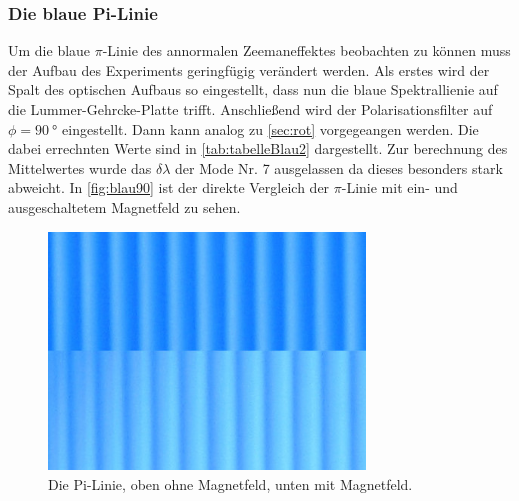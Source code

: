\subsubsection{Die blaue Pi-Linie}
Um die blaue $\pi$-Linie des annormalen Zeemaneffektes beobachten zu können muss der 
Aufbau des Experiments geringfügig verändert werden. Als erstes wird der Spalt des optischen 
Aufbaus so eingestellt, dass nun die blaue Spektrallienie auf die Lummer-Gehrcke-Platte trifft.
Anschließend wird der Polarisationsfilter auf $\phi=\SI[]{90}[]{\degree}$ eingestellt.
Dann kann analog zu \autoref{sec:rot} vorgegeangen werden. Die dabei errechnten Werte
sind in \autoref{tab:tabelleBlau2} dargestellt. Zur berechnung des Mittelwertes wurde das $\delta \lambda$ 
der Mode Nr. 7 ausgelassen da dieses besonders stark abweicht. In \autoref{fig:blau90} ist der direkte Vergleich
der $\pi$-Linie mit ein- und ausgeschaltetem Magnetfeld zu sehen.
\begin{figure}
  \centering
  \includegraphics[width=0.75\textwidth]{content/grafiken/blau 90.JPG}
  \caption{Die Pi-Linie, oben ohne Magnetfeld, unten mit Magnetfeld.}
  \label{fig:blau90}
\end{figure}



\FloatBarrier
